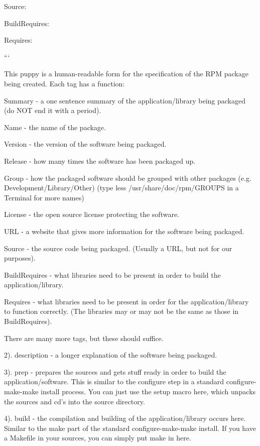 Source\-:

Build\-Requires\-:

Requires\-:

```

This puppy is a human-\/readable form for the specification of the R\-P\-M package being created. Each tag has a function\-:

{\ttfamily Summary} -\/ a one sentence summary of the application/library being packaged (do N\-O\-T end it with a period).

{\ttfamily Name} -\/ the name of the package.

{\ttfamily Version} -\/ the version of the software being packaged.

{\ttfamily Release} -\/ how many times the software has been packaged up.

{\ttfamily Group} -\/ how the packaged software should be grouped with other packages (e.\-g. Development/\-Library/\-Other) (type less /usr/share/doc/rpm/\-G\-R\-O\-U\-P\-S in a Terminal for more names)

{\ttfamily License} -\/ the open source license protecting the software.

{\ttfamily U\-R\-L} -\/ a website that gives more information for the software being packaged.

{\ttfamily Source} -\/ the source code being packaged. (Usually a U\-R\-L, but not for our purposes).

{\ttfamily Build\-Requires} -\/ what libraries need to be present in order to build the application/library.

{\ttfamily Requires} -\/ what libraries need to be present in order for the application/library to function correctly. (The libraries may or may not be the same as those in {\ttfamily Build\-Requires}).

There are many more tags, but these should suffice.

2). {\ttfamily description} -\/ a longer explanation of the software being packaged.

3). {\ttfamily prep} -\/ prepares the sources and gets stuff ready in order to build the application/software. This is similar to the configure step in a standard configure-\/make-\/make install process. You can just use the setup macro here, which unpacks the sources and cd's into the source directory.

4). {\ttfamily build} -\/ the compilation and building of the application/library occurs here. Similar to the make part of the standard configure-\/make-\/make install. If you have a Makefile in your sources, you can simply put make in here.

